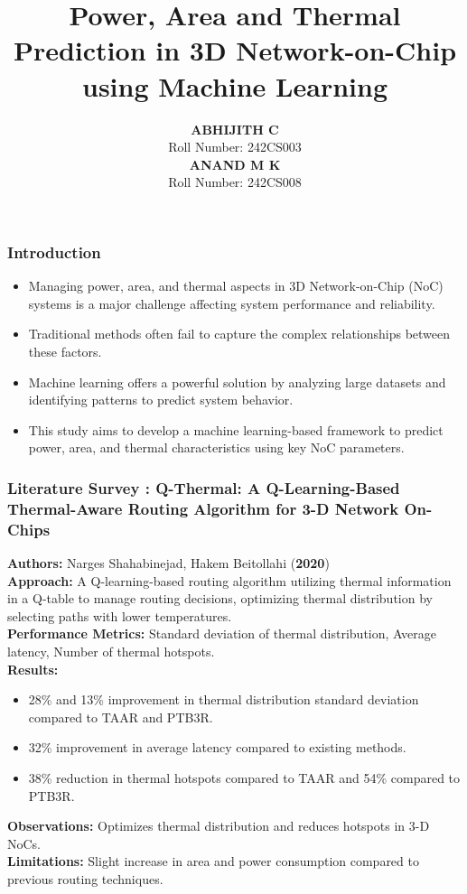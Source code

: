 \documentclass{beamer}
\title{Power, Area and Thermal Prediction in 3D Network-on-Chip using Machine Learning}
\author{
	\textbf{ABHIJITH C} \\ %
	Roll Number: 242CS003 \\ %
	\textbf{ANAND M K} \\ %
	Roll Number: 242CS008 %
}
\institute{
	Department of Computer Science and Engineering \\ 
	National Institute of Technology Karnataka (NITK) \\ 
	Surathkal, India
}
\date{} %
\begin{document}
	
	\frame{\titlepage}
	
\begin{frame}
\frametitle{Introduction}
\begin{itemize}
    \item Managing power, area, and thermal aspects in 3D Network-on-Chip (NoC) systems is a major challenge affecting system performance and reliability.
    \item Traditional methods often fail to capture the complex relationships between these factors.
    \item Machine learning offers a powerful solution by analyzing large datasets and identifying patterns to predict system behavior.
    \item This study aims to develop a machine learning-based framework to predict power, area, and thermal characteristics using key NoC parameters.
\end{itemize}
\end{frame}




\begin{frame}[fragile]
\frametitle{Literature Survey : Q-Thermal: A Q-Learning-Based Thermal-Aware Routing Algorithm for 3-D Network On-Chips}

\textbf{Authors:} Narges Shahabinejad, Hakem Beitollahi (\textbf{2020}) \\
\textbf{Approach:} A Q-learning-based routing algorithm utilizing thermal information in a Q-table to manage routing decisions, optimizing thermal distribution by selecting paths with lower temperatures. \\
\textbf{Performance Metrics:} Standard deviation of thermal distribution, Average latency, Number of thermal hotspots. \\
\textbf{Results:} 
\begin{itemize}
    \item 28\% and 13\% improvement in thermal distribution standard deviation compared to TAAR and PTB3R.
    \item 32\% improvement in average latency compared to existing methods.
    \item 38\% reduction in thermal hotspots compared to TAAR and 54\% compared to PTB3R.
\end{itemize}
\textbf{Observations:} Optimizes thermal distribution and reduces hotspots in 3-D NoCs. \\
\textbf{Limitations:} Slight increase in area and power consumption compared to previous routing techniques.
\end{frame}
\end{document}
